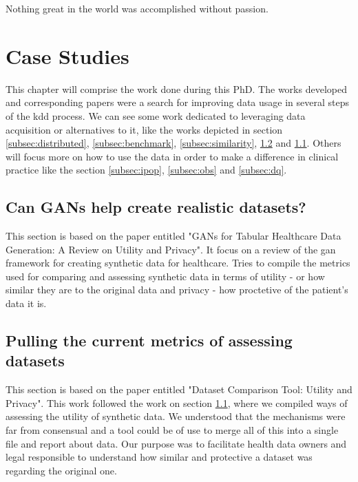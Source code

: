 \begin{savequote}[85mm]
Nothing great in the world was accomplished 
without passion.
\end{savequote}

\chapter{Case Studies}\label{chap:usecase}
This chapter will comprise the work done during this PhD. The works developed and corresponding papers were a search for improving data usage in several steps of the \ac{kdd} process. We can see some work dedicated to leveraging data acquisition or alternatives to it, like the works depicted in section \ref{subsec:distributed}, \ref{subsec:benchmark}, \ref{subsec:similarity}, \ref{subsec:tabular} and \ref{subsec:gans}. Others will focus more on how to use the data in order to make a difference in clinical practice like the section \ref{subsec:ipop}, \ref{subsec:obs} and \ref{subsec:dq}.



\section{Can GANs help create realistic datasets?}\label{subsec:gans}
This section is based on the paper entitled "GANs for Tabular Healthcare Data Generation: A Review on Utility and Privacy". It focus on a review of the \ac{gan} framework for creating synthetic data for healthcare. Tries to compile the metrics used for comparing and assessing synthetic data in terms of utility - or how similar they are to the original data and privacy - how proctetive of the patient's data it is. 



\section{Pulling the current metrics of assessing datasets}\label{subsec:tabular}
This section is based on the paper entitled "Dataset Comparison Tool: Utility and Privacy". This work followed the work on section \ref{subsec:gans}, where we compiled ways of assessing the utility of synthetic data. We understood that the mechanisms were far from consensual and a tool could be of use to merge all of this into a single file and report about data. Our purpose was to facilitate health data owners and legal responsible to understand how similar and protective a dataset was regarding the original one.

